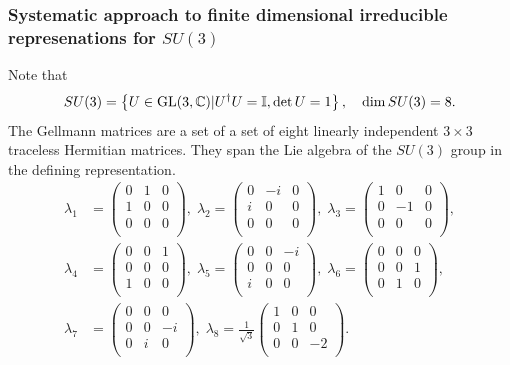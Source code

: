 \subsubsection{Systematic approach to finite dimensional irreducible represenations for $SU(3)$}
Note that
\begin{equation*}
	SU(3)=\left\{ U\in \text{GL}(3,\mathbb{C}) | U^\dagger U =\mathbb{I}, \det U = 1        \right\}, \quad \dim SU(3) = 8.
\end{equation*}
The Gellmann matrices are a set of  a set of eight linearly independent $3\times3$ traceless Hermitian matrices. They span the Lie algebra of the $SU(3)$ group in the defining representation. 
\begin{align*}
	\lambda_1 &= \begin{pmatrix}
		0&1&0\\
		1&0&0\\
		0&0&0\\
	\end{pmatrix},
\;
\lambda_2 = \begin{pmatrix}
	0 &-i&0\\
	i&0&0\\
	0&0&0\\
\end{pmatrix},
\;\lambda_3 = \begin{pmatrix}
	1&0&0\\
	0&-1&0\\
	0&0&0\\
\end{pmatrix},\\
\lambda_4 &=\begin{pmatrix}
	0&0&1\\
	0&0&0\\
	1&0&0\\
\end{pmatrix},\;
\lambda_5 =\begin{pmatrix}
	0&0&-i\\
	0&0&0\\
	i&0&0\\
\end{pmatrix},\;
\lambda_6=\begin{pmatrix}
	0&0&0\\
	0&0&1\\
	0&1&0\\
\end{pmatrix},\\
\lambda_7&= \begin{pmatrix}
	0&0&0\\
	0&0&-i\\
	0&i&0\\
\end{pmatrix},\;
\lambda_8=\frac{1}{\sqrt{3}}\begin{pmatrix}
	1&0&0\\
	0&1&0\\
	0&0&-2\\
\end{pmatrix}.
\end{align*}
